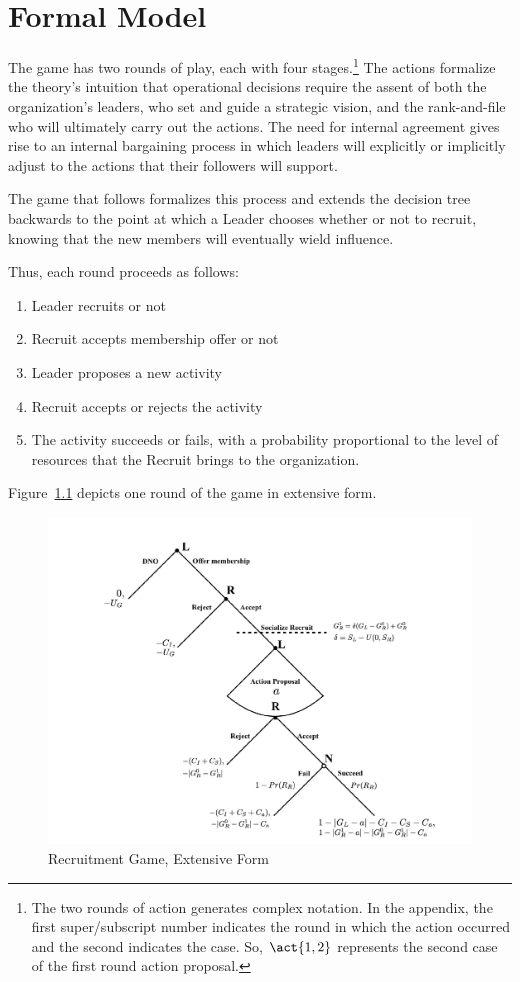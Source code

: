 \chapter{Formal Model}
\label{modelappendix}

The game has two rounds of play, each with four stages.\footnote{The two rounds of action generates complex notation. In the appendix, the first super/subscript number indicates the round in which the action occurred and the second indicates the case. So, $\act{1,2}$ represents the second case of the first round action proposal.} The actions formalize the theory's intuition that operational decisions require the assent of both the organization's leaders, who set and guide a strategic vision, and the rank-and-file who will ultimately carry out the actions. The need for internal agreement gives rise to an internal bargaining process in which leaders will explicitly or implicitly adjust to the actions that their followers will support.

The game that follows formalizes this process and extends the decision tree backwards to the point at which a Leader chooses whether or not to recruit, knowing that the new members will eventually wield influence.

Thus, each round proceeds as follows:

\begin{enumerate}
\item Leader recruits or not
\item Recruit accepts membership offer or not
\item Leader proposes a new activity
\item Recruit accepts or rejects the activity
\item The activity succeeds or fails, with a probability proportional to the level of resources that the Recruit brings to the organization.
\end{enumerate}

Figure~\ref{fig:extform} depicts one round of the game in extensive form.
\begin{figure}
  \centering
  \includegraphics[width=.85\columnwidth]{../Pictures/RecruitGame_Round1.pdf}
  \caption{Recruitment Game, Extensive Form}
  \label{fig:extform}
\end{figure}

